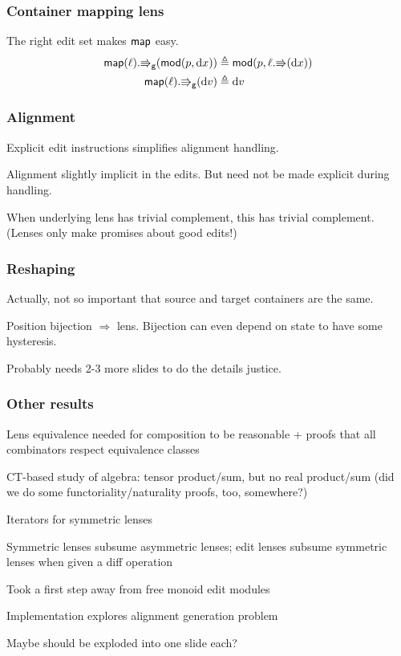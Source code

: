 \documentclass{beamer}
\begin{document}
\begin{frame}
    \frametitle{Container mapping lens}
    The right edit set makes $\mathsf{map}$ easy.
    \begin{align*}
        \mathsf{map}(\ell).\mathord{\Rrightarrow}_{\mathsf{g}}(\mathsf{mod}(p,\textrm{d} x))
            &\triangleq \mathsf{mod}(p,\ell.\mathord{\Rrightarrow}(\textrm{d} x)) \\
        \mathsf{map}(\ell).\mathord{\Rrightarrow}_{\mathsf{g}}(\textrm{d} v) &\triangleq \textrm{d} v
    \end{align*}

\end{frame}

\begin{frame}
    \frametitle{Alignment}
    Explicit edit instructions simplifies alignment handling.

    Alignment slightly implicit in the edits. But need not be made explicit
    during handling.

    When underlying lens has trivial complement, this has trivial
    complement. (Lenses only make promises about good edits!)
\end{frame}

\begin{frame}
    \frametitle{Reshaping}
    Actually, not so important that source and target containers are the
    same.

    Position bijection $\Rightarrow$ lens. Bijection can even depend on
    state to have some hysteresis.

    Probably needs 2-3 more slides to do the details justice.
\end{frame}

\begin{frame}
    \frametitle{Other results}
    Lens equivalence needed for composition to be reasonable + proofs that
    all combinators respect equivalence classes

    CT-based study of algebra: tensor product/sum, but no real product/sum
    (did we do some functoriality/naturality proofs, too, somewhere?)

    Iterators for symmetric lenses

    Symmetric lenses subsume asymmetric lenses; edit lenses subsume
    symmetric lenses when given a diff operation

    Took a first step away from free monoid edit modules

    Implementation explores alignment generation problem

    Maybe should be exploded into one slide each?
\end{frame}

\end{document}
